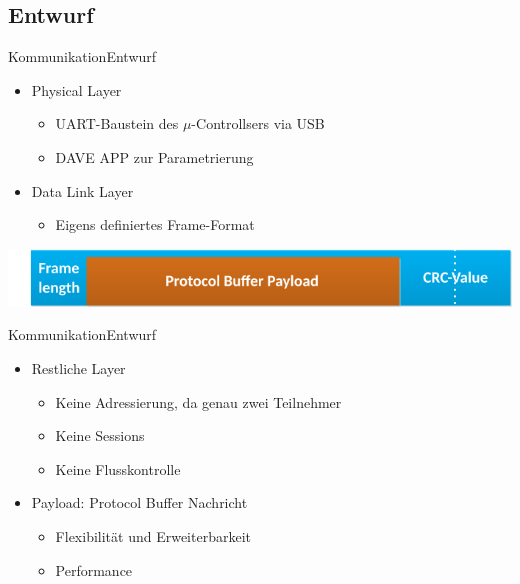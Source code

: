 \subsection{Entwurf}
\begin{frame}{Kommunikation}{Entwurf}
  \begin{itemize}
    \item Physical Layer
    \begin{itemize}
      \item UART-Baustein des $\mu$-Controllsers via USB
      \item DAVE APP zur Parametrierung
    \end{itemize}
    \item Data Link Layer
    \begin{itemize}
      \item Eigens definiertes Frame-Format
    \end{itemize}
  \end{itemize}
  \begin{center}
    \includegraphics[width=\textwidth]{../communication/MessageFormat}
  \end{center}
\end{frame}
\begin{frame}{Kommunikation}{Entwurf}
  \begin{itemize}
    \item Restliche Layer
    \begin{itemize}
    \item Keine Adressierung, da genau zwei Teilnehmer
    \item Keine Sessions
    \item Keine Flusskontrolle
    \end{itemize}
    \item Payload: Protocol Buffer Nachricht
    \begin{itemize}
      \item Flexibilität und Erweiterbarkeit
      \item Performance
    \end{itemize}
  \end{itemize}
\end{frame}
